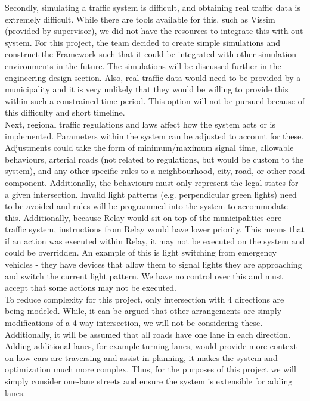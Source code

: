 \documentclass{report}
\begin{document}
Secondly, simulating a traffic system is difficult, and obtaining real traffic data is extremely difficult.
While there are tools available for this, such as Vissim (provided by supervisor), we did not have the resources to integrate this with out system.
For this project, the team decided to create simple simulations and construct the Framework such that it could be integrated with other simulation environments in the future.
The simulations will be discussed further in the engineering design section.
Also, real traffic data would need to be provided by a municipality and it is very unlikely that they would be willing to provide this within such a constrained time period.
This option will not be pursued because of this difficulty and short timeline.\\

Next, regional traffic regulations and laws affect how the system acts or is implemented.
Parameters within the system can be adjusted to account for these.
Adjustments could take the form of minimum/maximum signal time, allowable behaviours, arterial roads (not related to regulations, but would be custom to the system), and any other specific rules to a neighbourhood, city, road, or other road component.
Additionally, the behaviours must only represent the legal states for a given intersection.
Invalid light patterns (e.g. perpendicular green lights) need to be avoided and rules will be programmed into the system to accommodate this.
Additionally, because Relay would sit on top of the municipalities core traffic system, instructions from Relay would have lower priority.
This means that if an action was executed within Relay, it may not be executed on the system and could be overridden.
An example of this is light switching from emergency vehicles - they have devices that allow them to signal lights they are approaching and switch the current light pattern.
We have no control over this and must accept that some actions may not be executed.\\

To reduce complexity for this project, only intersection with 4 directions are being modeled. 
While, it can be argued that other arrangements are simply modifications of a 4-way intersection, we will not be considering these. 
Additionally, it will be assumed that all roads have one lane in each direction. 
Adding additional lanes, for example turning lanes, would provide more context on how cars are traversing and assist in planning, it makes the system and optimization much more complex. 
Thus, for the purposes of this project we will simply consider one-lane streets and ensure the system is extensible for adding lanes.\\
\end{document}

